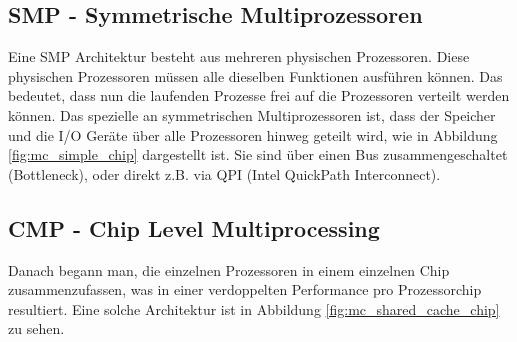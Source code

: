 \subsection{SMP - Symmetrische Multiprozessoren}
Eine SMP Architektur besteht aus mehreren physischen Prozessoren. Diese physischen Prozessoren müssen alle dieselben Funktionen ausführen können. Das bedeutet, dass nun die laufenden Prozesse frei auf die Prozessoren verteilt werden können.
Das spezielle an symmetrischen Multiprozessoren ist, dass der Speicher und die I/O Geräte über alle Prozessoren hinweg geteilt wird, wie in Abbildung \ref{fig:mc_simple_chip} dargestellt ist. Sie sind über einen Bus zusammengeschaltet (Bottleneck), oder direkt z.B. via QPI (Intel QuickPath Interconnect). 

\subsection{CMP - Chip Level Multiprocessing}
Danach begann man, die einzelnen Prozessoren in einem einzelnen Chip zusammenzufassen, was in einer verdoppelten Performance pro Prozessorchip resultiert. Eine solche Architektur ist in Abbildung \ref{fig:mc_shared_cache_chip} zu sehen. 

